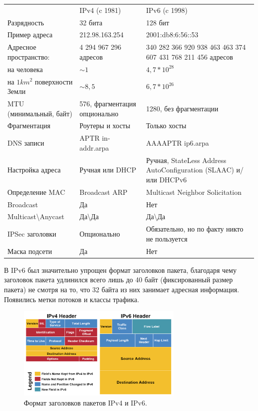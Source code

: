 \documentclass[10pt, a5paper]{article}
\begin{document}
\begin{table}
  \centering
  \begin{tabular}{ p{3cm} p{3cm} p{4cm} }
      							& IPv4 (c 1981) 	& IPv6 (c 1998) \\
     Разрядность  				&  32 бита 			& 128 бит  \\
     Пример адреса  			&  212.98.163.254  	&  2001:db8:6:56::53  \\
     Адресное пространство:  	&  4 294 967 296 адресов  &  340 282 366 920 938 463 463 374 607 431 768 211 456 адресов  \\
     на человека  				&  $\sim1$  			&  $4,7*10^{28}$  \\
     на $1 km^2$ поверхности Земли  &  $\sim8,5$  	&  $6,7*10^{26}$  \\
     MTU (минимальный, байт)  	&  576, фрагментация опционально  &  1280, без фрагментации  \\
     Фрагментация  				&  Роутеры и хосты 	&  Только хосты  \\
     DNS записи  				&  A\newline PTR in-addr.arpa				&  AAAA\newline PTR ip6.arpa \\
     Настройка адреса  			&  Ручная или DHCP 	&  Ручная, StateLess Address AutoConfiguration (SLAAC) и/или DHCPv6  \\
     Определение MAC  			&  Broadcast ARP  	&  Multicast Neighbor Solicitation  \\
     Broadcast  				&  Да  				&  Нет  \\
     Multicast\textbackslash{}Anycast  &  Да\textbackslash{}Да  &  Да\textbackslash{}Да  \\
     IPSec заголовки  			&  Опционально  	&  Обязательно, но по факту никто не пользуется \\
     Маска подсети  			&  Да  				&  Нет  \\
  \end{tabular}
\end{table}
В IPv6 был значительно упрощен формат заголовков пакета, благодаря чему заголовок пакета удлинился всего лишь до 40 байт (фиксированный размер пакета) не смотря на то, что 32 байта из них занимает адресная информация. Появились метки потоков и классы трафика.

\begin{figure}[h!]
  \centering
  \includegraphics[height=4.5cm]{Semernik2}
  \caption{Формат заголовков пакетов IPv4 и IPv6. ~\cite{Semernik-3}}
\end{figure}
\end{document}
